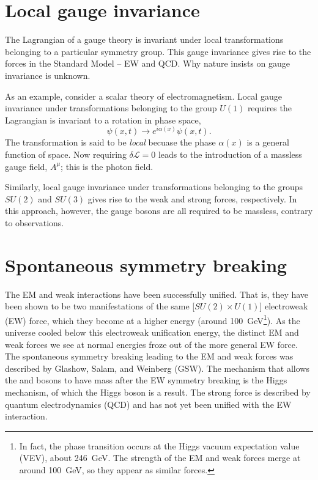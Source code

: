 \documentclass{report}
\begin{document}
\section{Local gauge invariance}
The Lagrangian of a gauge theory is invariant under local transformations belonging to a particular symmetry group. This gauge invariance gives rise to the forces in the Standard Model -- EW and QCD. Why nature insists on gauge invariance is unknown.

As an example, consider a scalar theory of electromagnetism. Local gauge invariance under transformations belonging to the group $U(1)$ requires the Lagrangian is invariant to a rotation in phase space,
\begin{equation}
\psi(x, t) \rightarrow e^{i\alpha(x)} \psi(x, t).
\end{equation}
The transformation is said to be \emph{local} becuase the phase $\alpha(x)$ is a general function of space. Now requiring $\delta\mathcal{L}=0$ leads to the introduction of a massless gauge field, $A^\mu$; this is the photon field.

Similarly, local gauge invariance under transformations belonging to the groups $SU(2)$ and $SU(3)$ gives rise to the weak and strong forces, respectively. In this approach, however, the gauge bosons are all required to be massless, contrary to observations.

\section{Spontaneous symmetry breaking}

The EM and weak interactions have been successfully unified. That is, they have been shown to be two manifestations of the same [$SU(2) \times U(1)$] electroweak (EW) force, which they become at a higher energy (around \SI{100}{\giga\electronvolt}\footnote{In fact, the phase transition occurs at the Higgs vacuum expectation value (VEV), about \SI{246}{\giga\electronvolt}. The strength of the EM and weak forces merge at around \SI{100}{\giga\electronvolt}, so they appear as similar forces.}). As the universe cooled below this electroweak unification energy, the distinct EM and weak forces we see at normal energies froze out of the more general EW force. The spontaneous symmetry breaking leading to the EM and weak forces was described by Glashow, Salam, and Weinberg (GSW). The mechanism that allows the \PW and \PZ bosons to have mass after the EW symmetry breaking is the Higgs mechanism, of which the Higgs boson is a result. The strong force is described by quantum electrodynamics (QCD) and has not yet been unified with the EW interaction. 
\end{document}
